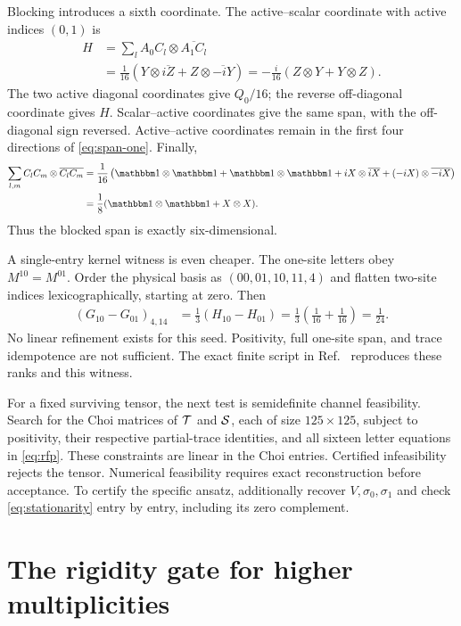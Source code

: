\documentclass[aps,pra,reprint,nofootinbib,onecolumn]{revtex4-2}
\begin{document}
Blocking introduces a sixth coordinate. The active--scalar coordinate
with active indices $(0,1)$ is
\begin{align}
	H & =\sum_l A_0C_l\otimes\overline{A_1C_l}
	\nonumber                                  \\
	  & =\frac1{16}\left(Y\otimes\overline{iZ}
	+Z\otimes\overline{-iY}\right)
	=-\frac{i}{16}(Z\otimes Y+Y\otimes Z).
	\label{eq:H}
\end{align}
The two active diagonal coordinates give $Q_0/16$; the reverse
off-diagonal coordinate gives $H$. Scalar--active coordinates give
the same span, with the off-diagonal sign reversed.
Active--active coordinates remain in the first four directions of
\cref{eq:span-one}. Finally,
\begin{align}
	\sum_{l,m}C_lC_m\otimes\overline{C_lC_m}
	 & =\frac1{16}\left(\Id\otimes\Id+\Id\otimes\Id
	+iX\otimes\overline{iX}
	+(-iX)\otimes\overline{-iX}\right)
	\nonumber                                       \\
	 & =\frac18(\Id\otimes\Id+X\otimes X).
\end{align}
Thus the blocked span is exactly six-dimensional.

A single-entry kernel witness is even cheaper.
The one-site letters obey $M^{10}=M^{01}$.
Order the physical basis as $(00,01,10,11,4)$ and flatten two-site
indices lexicographically, starting at zero. Then
\begin{align}
	(G_{10}-G_{01})_{4,14}
	 & =\frac13(H_{10}-H_{01})
	=\frac13\left(\frac1{16}+\frac1{16}\right)
	=\frac1{24}.
	\label{eq:seed-reject}
\end{align}
No linear refinement exists for this seed. Positivity, full one-site
span, and trace idempotence are not sufficient. The exact finite script
in Ref.~\cite{Checks} reproduces these ranks and this witness.

For a fixed surviving tensor, the next test is semidefinite channel
feasibility. Search for the Choi matrices of $\mathcal{T}$ and $\mathcal{S}$,
each of size $125\times125$, subject to positivity, their respective
partial-trace identities, and all sixteen letter equations in
\cref{eq:rfp}. These constraints are linear in the Choi entries.
Certified infeasibility rejects the tensor. Numerical feasibility
requires exact reconstruction before acceptance. To certify the
specific ansatz, additionally recover $V,\sigma_0,\sigma_1$ and check
\cref{eq:stationarity} entry by entry, including its zero complement.

\section{The rigidity gate for higher multiplicities}
\label{sec:rigidity}
\end{document}
